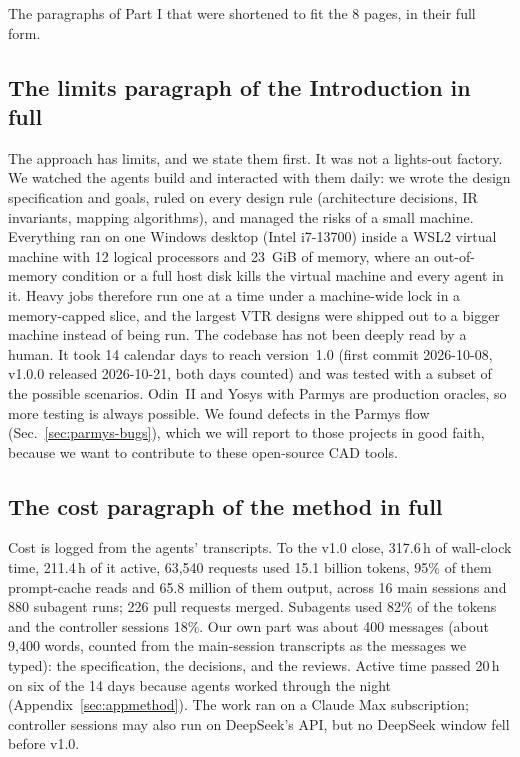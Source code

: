 \documentclass[conference]{IEEEtran}
\begin{document}
The paragraphs of Part I that were shortened to fit the 8 pages, in their full form.

\subsection{The limits paragraph of the Introduction in full}

The approach has limits, and we state them first. It was not a lights-out factory. We watched the agents build and interacted with them daily: we wrote the design specification and goals, ruled on every design rule (architecture decisions, IR invariants, mapping algorithms), and managed the risks of a small machine. Everything ran on one Windows desktop (Intel i7-13700) inside a WSL2 virtual machine with 12 logical processors and 23\, GiB of memory, where an out-of-memory condition or a full host disk kills the virtual machine and every agent in it. Heavy jobs therefore run one at a time under a machine-wide lock in a memory-capped slice, and the largest VTR designs were shipped out to a bigger machine instead of being run. The codebase has not been deeply read by a human. It took 14 calendar days to reach version~1.0 (first commit 2026-10-08, v1.0.0 released 2026-10-21, both days counted) and was tested with a subset of the possible scenarios. Odin~II and Yosys with Parmys are production oracles, so more testing is always possible. We found defects in the Parmys flow (Sec.~\ref{sec:parmys-bugs}), which we will report to those projects in good faith, because we want to contribute to these open-source CAD tools.

\subsection{The cost paragraph of the method in full}

Cost is logged from the agents' transcripts. To the v1.0 close, 317.6\,h of wall-clock time, 211.4\,h of it active, 63,540 requests used 15.1 billion tokens, 95\% of them prompt-cache reads and 65.8 million of them output, across 16 main sessions and 880 subagent runs; 226 pull requests merged. Subagents used 82\% of the tokens and the controller sessions 18\%. Our own part was about 400 messages (about 9,400 words, counted from the main-session transcripts as the messages we typed): the specification, the decisions, and the reviews. Active time passed 20\,h on six of the 14 days because agents worked through the night (Appendix~\ref{sec:appmethod}). The work ran on a Claude Max subscription; controller sessions may also run on DeepSeek's API, but no DeepSeek window fell before v1.0.
\end{document}
